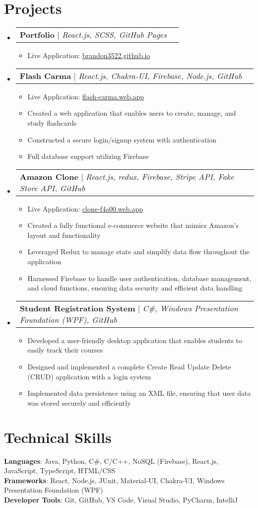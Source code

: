 \documentclass[letterpaper,11pt]{article}
\makeatletter
\newcommand{\resumeItem}[1]{
  \item\small{
    {#1 \vspace{-2pt}}
  }
}
\newcommand{\resumeProjectHeading}[2]{
    \item
    \begin{tabular*}{0.97\textwidth}{l@{\extracolsep{\fill}}r}
      \small#1 & #2 \\
    \end{tabular*}\vspace{-7pt}
}
\newcommand{\resumeSubHeadingListStart}{\begin{itemize}[leftmargin=0.15in, label={}]}
\newcommand{\resumeSubHeadingListEnd}{\end{itemize}}
\newcommand{\resumeItemListStart}{\begin{itemize}}
\newcommand{\resumeItemListEnd}{\end{itemize}\vspace{-5pt}}
\makeatother
\begin{document}
\section{Projects}
\resumeSubHeadingListStart
	\resumeProjectHeading
			{\textbf{Portfolio} $|$ \emph{React.js, SCSS, GitHub Pages}}{}
			\resumeItemListStart
				\resumeItem{Live Application: \href{https://brandon3522.github.io}{brandon3522.github.io}}
			\resumeItemListEnd
	\resumeProjectHeading
			{\textbf{Flash Carma} $|$ \emph{React.js, Chakra-UI, Firebase, Node.js, GitHub}}{}
			\resumeItemListStart
			\resumeItem{Live Application: \href{https://flash-carma.web.app}{flash-carma.web.app}}
				\resumeItem{Created a web application that enables users to create, manage, and study flashcards}
				\resumeItem{Constructed a secure login/signup system with authentication}
				\resumeItem{Full database support utilizing Firebase}
			\resumeItemListEnd
	\resumeProjectHeading
			{\textbf{Amazon Clone} $|$ \emph{React.js, redux, Firebase, Stripe API, Fake Store API, GitHub}}{}
			\resumeItemListStart
				\resumeItem{Live Application: \href{https://clone-f4a00.web.app}{clone-f4a00.web.app}}
				\resumeItem{Created a fully functional e-commerce website that mimics Amazon's layout and functionality}
				\resumeItem{Leveraged Redux to manage state and simplify data flow throughout the application}
				\resumeItem{Harnessed Firebase to handle user authentication, database management, and cloud functions, ensuring data security and efficient data handling}
			\resumeItemListEnd
	\resumeProjectHeading
			{\textbf{Student Registration System} $|$ \emph{C\#, Windows Presentation Foundation (WPF), GitHub}}{}
			\resumeItemListStart
				\resumeItem{Developed a user-friendly desktop application that enables students to easily track their courses}
				\resumeItem{Designed and implemented a complete Create Read Update Delete (CRUD) application with a login system}
				\resumeItem{Implemented data persistence using an XML file, ensuring that user data was stored securely and efficiently}
			\resumeItemListEnd
	
\resumeSubHeadingListEnd



%
\section{Technical Skills}
\begin{itemize}[leftmargin=0.15in, label={}]
\small{\item{
 \textbf{Languages}{: Java, Python, C\#, C/C++, NoSQL (Firebase), React.js, JavaScript, TypeScript, HTML/CSS} \\
 \textbf{Frameworks}{: React, Node.js, JUnit, Material-UI, Chakra-UI, Windows Presentation Foundation (WPF)} \\
 \textbf{Developer Tools}{: Git, GitHub, VS Code, Visual Studio, PyCharm, IntelliJ} \\
}}
\end{itemize}
\end{document}
